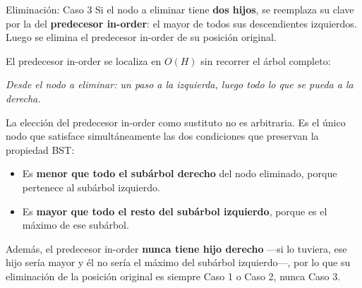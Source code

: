 \begin{definicion}{Eliminación: Caso 3}
Si el nodo a eliminar tiene \textbf{dos hijos}, se reemplaza su clave por la del
\textbf{predecesor in-order}: el mayor de todos sus descendientes izquierdos. Luego
se elimina el predecesor in-order de su posición original.
\end{definicion}

El predecesor in-order se localiza en $O(H)$ sin recorrer el árbol completo:

\begin{center}
\textit{Desde el nodo a eliminar: un paso a la izquierda, luego todo lo que se pueda
a la derecha.}
\end{center}

La elección del predecesor in-order como sustituto no es arbitraria. Es el único nodo
que satisface simultáneamente las dos condiciones que preservan la propiedad BST:

\begin{itemize}
    \item Es \textbf{menor que todo el subárbol derecho} del nodo eliminado, porque
          pertenece al subárbol izquierdo.
    \item Es \textbf{mayor que todo el resto del subárbol izquierdo}, porque es el
          máximo de ese subárbol.
\end{itemize}

Además, el predecesor in-order \textbf{nunca tiene hijo derecho} —si lo tuviera, ese
hijo sería mayor y él no sería el máximo del subárbol izquierdo—, por lo que su
eliminación de la posición original es siempre Caso 1 o Caso 2, nunca Caso 3.


